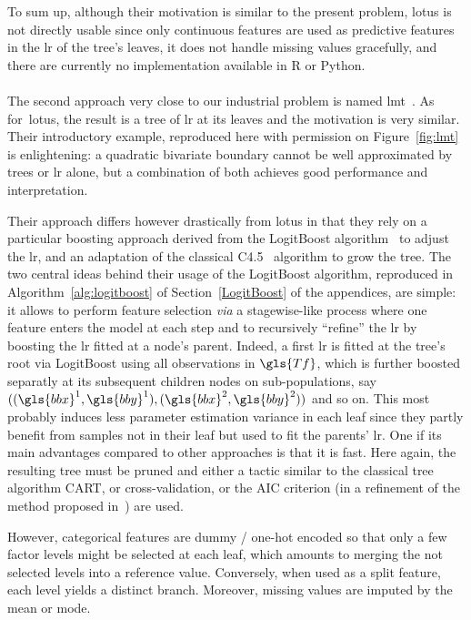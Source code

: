 To sum up, although their motivation is similar to the present problem, \gls{lotus} is not directly usable since only continuous features are used as predictive features in the \gls{lr} of the tree's leaves, it does not handle missing values gracefully, and there are currently no implementation available in \textsf{R} or Python.

\paragraph{}

The second approach very close to our industrial problem is named \gls{lmt}~\cite{landwehr2005logistic}. As for~\gls{lotus}, the result is a tree of \gls{lr} at its leaves and the motivation is very similar. Their introductory example, reproduced here with permission on Figure~\ref{fig:lmt} is enlightening: a quadratic bivariate boundary cannot be well approximated by trees or \gls{lr} alone, but a combination of both achieves good performance and interpretation.

Their approach differs however drastically from \gls{lotus} in that they rely on a particular boosting approach derived from the LogitBoost algorithm~\cite{friedman2000additive} to adjust the \gls{lr}, and an adaptation of the classical C4.5~\cite{quinlan2014c4} algorithm to grow the tree. The two central ideas behind their usage of the LogitBoost algorithm, reproduced in Algorithm~\ref{alg:logitboost} of Section~\ref{LogitBoost} of the appendices, are simple: it allows to perform feature selection \textit{via} a stagewise-like process where one feature enters the model at each step and to recursively ``refine'' the \gls{lr} by boosting the \gls{lr} fitted at a node's parent. Indeed, a first \gls{lr} is fitted at the tree's root via LogitBoost using all observations in $\gls{Tf}$, which is further boosted separatly at its subsequent children nodes on sub-populations, say $((\gls{bbx}^1,\gls{bby}^1), (\gls{bbx}^2,\gls{bby}^2))$ and so on. This most probably induces less parameter estimation variance in each leaf since they partly benefit from samples not in their leaf but used to fit the parents' \gls{lr}. One if its main advantages compared to other approaches is that it is fast. Here again, the resulting tree must be pruned and either a tactic similar to the classical tree algorithm CART, or cross-validation, or the AIC criterion (in a refinement of the method proposed in~\cite{sumner2005speeding}) are used.

However, categorical features are dummy / one-hot encoded so that only a few factor levels might be selected at each leaf, which amounts to merging the not selected levels into a reference value. Conversely, when used as a split feature, each level yields a distinct branch. Moreover, missing values are imputed by the mean or mode.

